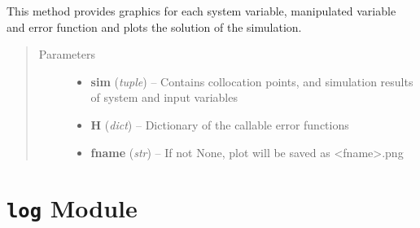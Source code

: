 \documentclass[letterpaper,10pt,english]{sphinxmanual}
\begin{document}

\begin{fulllineitems}
\label{pytrajectory:pytrajectory.utilities.plot}
This method provides graphics for each system variable, manipulated
variable and error function and plots the solution of the simulation.
\begin{quote}\begin{description}
\item[{Parameters}] \leavevmode\begin{itemize}
\item {} 
\textbf{sim} (\emph{tuple}) -- Contains collocation points, and simulation results of system and input variables

\item {} 
\textbf{H} (\emph{dict}) -- Dictionary of the callable error functions

\item {} 
\textbf{fname} (\emph{str}) -- If not None, plot will be saved as \textless{}fname\textgreater{}.png

\end{itemize}

\end{description}\end{quote}

\end{fulllineitems}



\section{\texttt{log} Module}
\label{pytrajectory:module-pytrajectory.log}\label{pytrajectory:log-module}

\begin{fulllineitems}
\label{pytrajectory:pytrajectory.log.IPS}
\end{fulllineitems}


\begin{fulllineitems}
\label{pytrajectory:pytrajectory.log.Logger}~

\begin{fulllineitems}
\label{pytrajectory:pytrajectory.log.Logger.write}
\end{fulllineitems}


\end{fulllineitems}
\end{document}
